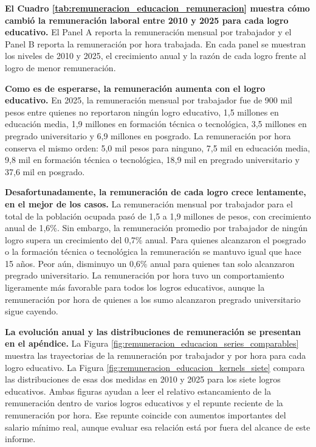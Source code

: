 \textbf{El Cuadro \ref{tab:remuneracion_educacion_remuneracion} muestra cómo cambió la remuneración laboral entre 2010 y 2025 para cada logro educativo.} El Panel A reporta la remuneración mensual por trabajador y el Panel B reporta la remuneración por hora trabajada. En cada panel se muestran los niveles de 2010 y 2025, el crecimiento anual y la razón de cada logro frente al logro de menor remuneración.



\textbf{Como es de esperarse, la remuneración aumenta con el logro educativo.} En 2025, la remuneración mensual por trabajador fue de 900 mil pesos entre quienes no reportaron ningún logro educativo, 1,5 millones en educación media, 1,9 millones en formación técnica o tecnológica, 3,5 millones en pregrado universitario y 6,9 millones en posgrado. La remuneración por hora conserva el mismo orden: 5,0 mil pesos para ninguno, 7,5 mil en educación media, 9,8 mil en formación técnica o tecnológica, 18,9 mil en pregrado universitario y 37,6 mil en posgrado.

\textbf{Desafortunadamente, la remuneración de cada logro crece lentamente, en el mejor de los casos.} La remuneración mensual por trabajador para el total de la población ocupada pasó de 1,5 a 1,9 millones de pesos, con crecimiento anual de 1,6\%. Sin embargo, la remuneración promedio por trabajador de ningún logro supera un crecimiento del 0,7\% anual. Para quienes alcanzaron el posgrado o la formación técnica o tecnológica la remuneración se mantuvo igual que hace 15 años. Peor aún, disminuyo un 0,6\% anual para quienes tan solo alcanzaron pregrado universitario. La remuneración por hora tuvo un comportamiento ligeramente más favorable para todos los logros educativos, aunque la remuneración por hora de quienes a los sumo alcanzaron pregrado universitario sigue cayendo.


\textbf{La evolución anual y las distribuciones de remuneración se presentan en el apéndice.} La Figura \ref{fig:remuneracion_educacion_series_comparables} muestra las trayectorias de la remuneración por trabajador y por hora para cada logro educativo. La Figura \ref{fig:remuneracion_educacion_kernels_siete} compara las distribuciones de esas dos medidas en 2010 y 2025 para los siete logros educativos. Ambas figuras ayudan a leer el relativo estancamiento de la remuneración dentro de varios logros educativos y el repunte reciente de la remuneración por hora. Ese repunte coincide con aumentos importantes del salario mínimo real, aunque evaluar esa relación está por fuera del alcance de este informe.

